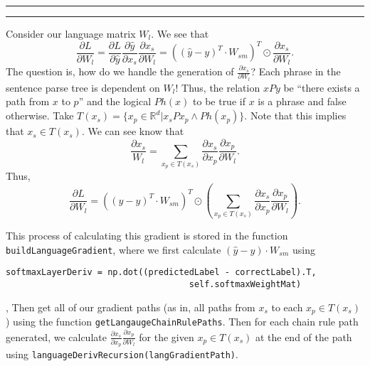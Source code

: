 \documentclass[11pt]{article}
\newcounter{questionCounter}
\newcounter{partCounter}[questionCounter]
\newenvironment{question}[2][\arabic{questionCounter}]{%
    \addtocounter{questionCounter}{1}%
    \setcounter{partCounter}{0}%
    \vspace{.25in} \hrule \vspace{0.5em}%
        \noindent{\bf #2}%
    \vspace{0.8em} \hrule \vspace{.10in}%
}{}
\begin{document}
\begin{question}{Language Matrix}
Consider our language matrix $W_l$. We see that
$$\frac{\partial L}{\partial W_l}
= \frac{\partial L}{\partial \hat{y}}\frac{\partial \hat{y}}{
\partial x_s} \frac{\partial x_s}{\partial W_l}
= \left((\hat{y}-y)^T \cdot W_{sm}\right)^T \odot \frac{\partial x_s}{
\partial W_l}.$$
The question is, how do we handle the generation of $\frac{\partial x_s}{
\partial W_l}$? Each phrase in the sentence parse tree is dependent on
$W_l$! Thus, the relation $xPy$ be ``there exists a path from
$x$ to $p$'' and the logical $Ph(x)$ to be true if $x$ is a phrase and
false otherwise. Take $T(x_s) =
\{x_p \in \mathbb{R}^d | x_sPx_p \wedge Ph(x_p)\}.$ Note that this implies
that $x_s \in T(x_s).$ We can see know that
$$\frac{\partial x_s}{W_l} 
= \sum_{x_p \in T(x_s)} \frac{\partial x_s}{\partial x_p}\frac{\partial x_p}
{\partial W_l}.$$
Thus,
$$\frac{\partial L}{\partial W_l}
    = ((\hat{y}-y)^T \cdot W_{sm})^T \odot \left(\sum_{x_p \in T(x_s)}
    \frac{\partial x_s}{\partial x_p}
    \frac{\partial x_p}{\partial W_l}\right).$$

This process of calculating this gradient is stored in the function
\verb|buildLanguageGradient|,
where we first calculate
$(\hat{y}-y) \cdot W_{sm}$ using
\begin{verbatim}
softmaxLayerDeriv = np.dot((predictedLabel - correctLabel).T,
                                    self.softmaxWeightMat)
\end{verbatim}
, Then get all of our gradient paths (as in, all paths from
$x_s$ to each $x_p \in T(x_s)$) using the function
\verb|getLangaugeChainRulePaths|. Then for each chain rule path generated,
we calculate $\frac{\partial x_s}{\partial x_p}\frac{\partial x_p}{\partial W_l}
$ for the given $x_p \in T(x_s)$ at the end of the path 
using \verb|languageDerivRecursion(langGradientPath)|.

\end{question}
\end{document}

